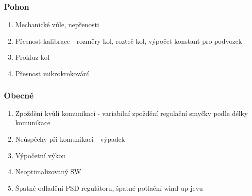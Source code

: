 \subsubsection{Pohon}
\begin{enumerate}
    \item Mechanické vůle, nepřenosti
    \item Přesnost kalibrace - rozměry kol, rozteč kol, výpočet konstant pro podvozek
    \item Prokluz kol
    \item Přesnost mikrokrokování
\end{enumerate}

\subsubsection{Obecné}
\begin{enumerate}
    \item Zpoždění kvůli komunikaci - variabilní zpoždění regulační smyčky podle délky komunikace
    \item Neúspěchy při komunikaci - výpadek
    \item Výpočetní výkon
    \item Neoptimalizovaný SW
    \item Špatné odladění PSD regulátoru, špatné potlační wind-up jevu
\end{enumerate}
